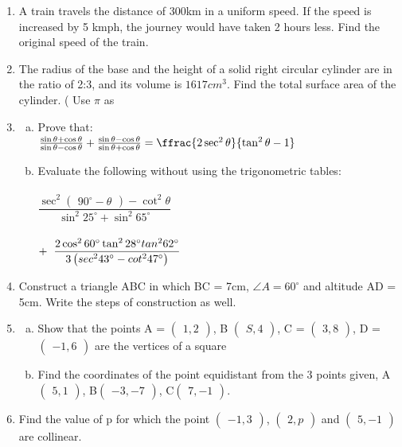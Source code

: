 \documentclass[journal,12pt,twocolumn]{IEEEtran}
\newcommand{\myvec}[1]{\ensuremath{\begin{pmatrix}#1\end{pmatrix}}}
\begin{document}
\begin{enumerate}[label=1.\arabic*]
\begin{enumerate}[label=2.\arabic*]
\item A train travels the distance of 300km in a uniform speed. If the speed
is increased by 5 kmph, the journey would have taken 2 hours less. Find the 
original speed of the train.\\
\item The radius of the base and the height of a solid right circular cylinder
are in the ratio of 2:3, and its volume is \(1617 cm^3\). Find the total 
surface area of the cylinder. ( Use $\pi$  as %
\item 
\begin{enumerate}[a)] 
    \item  Prove that:\\
     $ \frac{\sin{\theta} + \cos{\theta}}{\sin{\theta} - \cos{\theta}}  + \frac{\sin{\theta} - \cos{\theta}}{\sin{\theta} + \cos{\theta}} = \ffrac{2 \sec^2 \theta}{\tan^2 \theta - 1} $\\
     \item Evaluate the following without using the trigonometric tables:\\
    \vspace{2mm}\\
    $ \dfrac{\sec^2\myvec{90^\circ - \theta} - \cot^2\theta}{\sin^2 25^\circ + \sin^2 65^\circ }$\\
    \vspace{2mm}\\
    $ + \hspace{2mm} \dfrac{2\cos^2 60^\circ \tan^2 28^\circ tan^2 62^\circ}{3\myvec{sec^2 43^\circ - cot^2 47^\circ}}$\\
\end{enumerate}

\item Construct a triangle ABC in which BC = 7cm, $\angle{A} = 60^\circ $  and altitude AD = 5cm. Write the steps of construction as well.\\

\item \begin{enumerate}[a)] 
    \item Show that the points A = \myvec{1,2}, B \myvec{S,4}, C = \myvec{3,8}, D = \myvec{-1,6} are the vertices of a square\\
    \item Find the coordinates of the point equidistant from the 3 points given, A\myvec{5,1}, B\myvec{-3, -7}, C\myvec{7,-1}.\\
\end{enumerate}
\item Find the value of p for which the point \myvec{-1,3}, \myvec{2,p} and \myvec{5,-1} are collinear. \\


\end{enumerate}
\end{enumerate}
\end{document}
